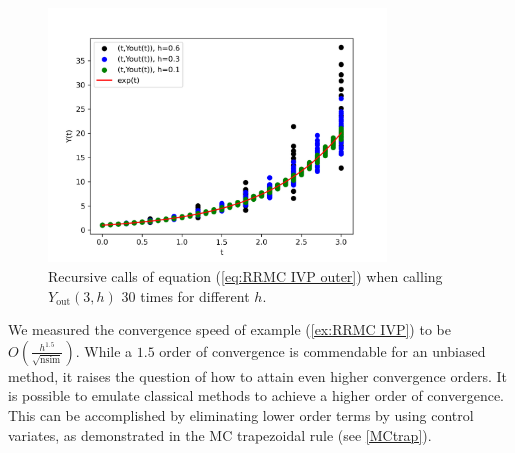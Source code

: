 \documentclass[a4paper,12pt]{article}
\begin{document}
\begin{pythonn} \label{py:RRMC IVP}

    \begin{figure}[h!]
        \centering
        \includegraphics[width=0.8\textwidth]{plots/RRMC IVP.png}
        \caption{Recursive calls of equation (\ref{eq:RRMC IVP outer})
            when calling $Y_{\text{out}}(3,h)$ $30$ times for different $h$.  }
        \label{fig:RRMC IVP}
    \end{figure}
\end{pythonn}

We measured the convergence speed of example (\ref{ex:RRMC IVP}) to
be $O\left(\frac{h^{1.5}}{\sqrt{\text{nsim}}} \right)$.
While a $1.5$ order of convergence is commendable for an unbiased method,
it raises the question of how to attain even higher convergence orders.
It is possible to emulate classical methods to
achieve a higher order of convergence. This can be accomplished by eliminating
lower order terms by using control variates, as demonstrated in the MC trapezoidal
rule (see \ref{MCtrap}).
\end{document}

